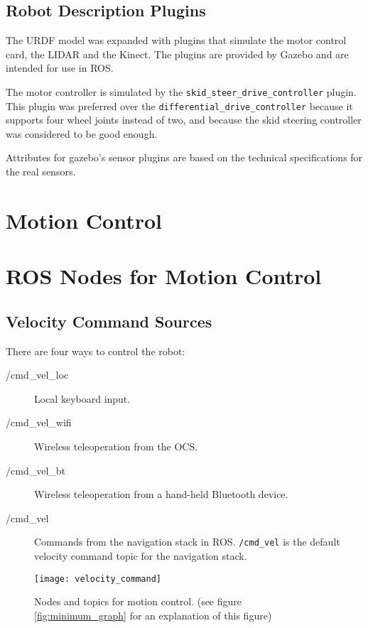 \subsection{Robot Description Plugins}

The \ac{URDF} model was expanded with plugins that simulate the motor control card, the \ac{LIDAR} and the Kinect. The plugins are provided by Gazebo and are intended for use in \ac{ROS}. 

The motor controller is simulated by the \texttt{skid\_steer\_drive\_controller} plugin. This plugin was preferred over the \texttt{differential\_drive\_controller} because it supports four wheel joints instead of two, and because the skid steering controller was considered to be good enough. 

Attributes for gazebo's sensor plugins are based on the technical specifications\cite{hokuyo_spec} for the real sensors. 

\section{Motion Control}


\section{ROS Nodes for Motion Control}


\subsection{Velocity Command Sources}

There are four ways to control the robot:

\begin{description}
	\item[/cmd\_vel\_loc] Local keyboard input.
	\item[/cmd\_vel\_wifi] Wireless teleoperation from the \ac{OCS}.
	\item[/cmd\_vel\_bt] Wireless teleoperation from a hand-held Bluetooth device.
	\item[/cmd\_vel] Commands from the navigation stack in \ac{ROS}. \texttt{/cmd\_vel} is the default \: \: velocity command topic for the navigation stack.
\end{description}

\begin{figure}[h]
	\centering
	\texttt{[image: velocity\_command]}
	\caption{Nodes and topics for motion control. (see figure \ref{fig:minimum_graph} for an explanation of this figure)}
	\label{fig:move_base_nodes}
\end{figure}


